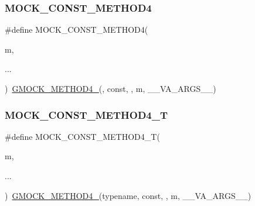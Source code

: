 \mbox{\label{_obj__test_2lib_2googletest-release-1_88_81_2googlemock_2include_2gmock_2gmock-generated-function-mockers_8h_a4614e9d6b24dff60c30dd4dedf494c6c}} 
\subsubsection{\texorpdfstring{MOCK\_CONST\_METHOD4}{MOCK\_CONST\_METHOD4}}
{\footnotesize\ttfamily \#define M\+O\+C\+K\+\_\+\+C\+O\+N\+S\+T\+\_\+\+M\+E\+T\+H\+O\+D4(\begin{DoxyParamCaption}\item[{}]{m,  }\item[{}]{... }\end{DoxyParamCaption})~\mbox{\hyperlink{_obj__test_2lib_2googletest-release-1_88_81_2googlemock_2include_2gmock_2gmock-generated-function-mockers_8h_ab6430f2cfad9de4aca5258ea559294bb}{G\+M\+O\+C\+K\+\_\+\+M\+E\+T\+H\+O\+D4\+\_\+}}(, const, , m, \+\_\+\+\_\+\+V\+A\+\_\+\+A\+R\+G\+S\+\_\+\+\_\+)}

\mbox{\label{_obj__test_2lib_2googletest-release-1_88_81_2googlemock_2include_2gmock_2gmock-generated-function-mockers_8h_a52290b1b841869d2d624b60ba1b6c3c4}} 
\subsubsection{\texorpdfstring{MOCK\_CONST\_METHOD4\_T}{MOCK\_CONST\_METHOD4\_T}}
{\footnotesize\ttfamily \#define M\+O\+C\+K\+\_\+\+C\+O\+N\+S\+T\+\_\+\+M\+E\+T\+H\+O\+D4\+\_\+T(\begin{DoxyParamCaption}\item[{}]{m,  }\item[{}]{... }\end{DoxyParamCaption})~\mbox{\hyperlink{_obj__test_2lib_2googletest-release-1_88_81_2googlemock_2include_2gmock_2gmock-generated-function-mockers_8h_ab6430f2cfad9de4aca5258ea559294bb}{G\+M\+O\+C\+K\+\_\+\+M\+E\+T\+H\+O\+D4\+\_\+}}(typename, const, , m, \+\_\+\+\_\+\+V\+A\+\_\+\+A\+R\+G\+S\+\_\+\+\_\+)}

